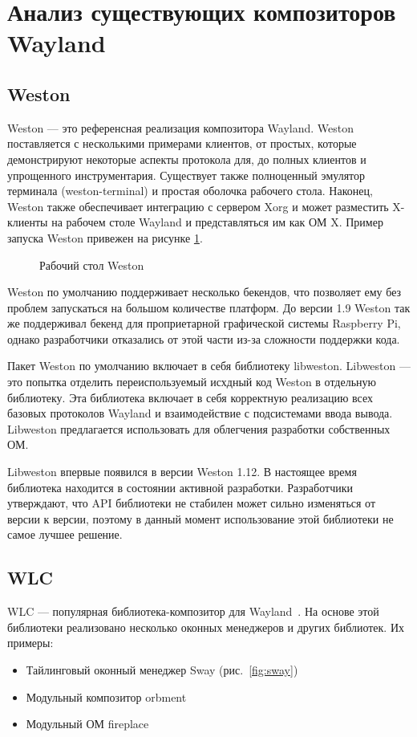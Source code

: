 \section{Анализ существующих композиторов Wayland}
\subsection{Weston}
Weston --- это референсная реализация композитора Wayland. Weston поставляется с несколькими примерами клиентов, от простых, которые демонстрируют некоторые аспекты протокола для, до полных клиентов и упрощенного инструментария. Существует также полноценный эмулятор терминала (weston-terminal) и простая оболочка рабочего стола. Наконец, Weston также обеспечивает интеграцию с сервером Xorg и может разместить X-клиенты на рабочем столе Wayland и представляться им как ОМ X. Пример запуска Weston привежен на рисунке \ref{fig:weston}.

\begin{figure}[h!]
\caption{Рабочий стол Weston}
\label{fig:weston}
\end{figure}

Weston по умолчанию поддерживает несколько бекендов, что позволяет ему без проблем запускаться на большом количестве платформ. До версии 1.9 Weston так же поддерживал бекенд для проприетарной графической системы Raspberry Pi, однако разработчики отказались от этой части из-за сложности поддержки кода.

Пакет Weston по умолчанию включает в себя библиотеку libweston. Libweston --- это попытка отделить переиспользуемый исхдный код Weston в отдельную библиотеку. Эта библиотека включает в себя корректную реализацию всех базовых протоколов Wayland и взаимодействие с подсистемами ввода вывода. Libweston предлагается использовать для облегчения разработки собственных ОМ.

Libweston впервые появился в версии Weston 1.12. В настоящее время библиотека находится в состоянии активной разработки. Разработчики утверждают, что API библиотеки не стабилен может сильно изменяться от версии к версии, поэтому в данный момент использование этой библиотеки не самое лучшее решение. 

\subsection{WLC}
WLC --- популярная библиотека-композитор для Wayland~\cite{wlc}. На основе этой библиотеки реализовано несколько оконных менеджеров и других библиотек. Их примеры:
\begin{itemize}
\item Тайлинговый оконный менеджер Sway (рис.~\ref{fig:sway})
\item Модульный композитор orbment
\item Модульный ОМ fireplace
\end{itemize}

